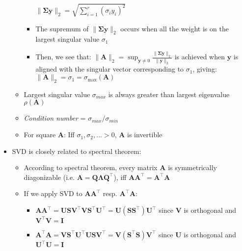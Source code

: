 \begin{itemize}
\begin{itemize}
\begin{itemize}
            $\|\boldsymbol{\Sigma} \boldsymbol{y}\|_2 = \sqrt{\sum_{i=1}^r (\sigma_i y_i)^2}$
            \item The supremum of $\|\boldsymbol{\Sigma} \boldsymbol{y}\|_2$ occurs when all the weight is on the largest singular value $\sigma_1$ 
            \item Then, we see that:
            $\|\boldsymbol{A}\|_2 = \sup_{\boldsymbol{y} \neq 0} \frac{\|\boldsymbol{\Sigma} \boldsymbol{y}\|_2}{\|\boldsymbol{y}\|_2}$ is achieved when $\boldsymbol{y}$ is aligned with the singular vector corresponding to $\sigma_1$, giving:
            $\|\boldsymbol{A}\|_2 = \sigma_1 = \sigma_{\max}(\boldsymbol{A})$
        \end{itemize}
        \item Largest singular value $\sigma_{max}$ is always greater than largest eigenvalue $\rho(\boldsymbol{A})$
        \item \emph{Condition number} = $\sigma_{max} / \sigma_{min}$
        \item For square $\boldsymbol{A}$: Iff $\sigma_1, \sigma_2, ... > 0$, $\boldsymbol{A}$ is invertible 
    \end{itemize}
    \item SVD is closely related to spectral theorem:
    \begin{itemize}
        \item According to spectral theorem, every matrix $\boldsymbol{A}$ is symmetrically diagonizable (i.e. $\boldsymbol{A} = \boldsymbol{Q} \boldsymbol{\Lambda} \boldsymbol{Q}^\intercal$), iff $\boldsymbol{A}\boldsymbol{A}^\intercal = \boldsymbol{A}^\intercal\boldsymbol{A}$
        \item If we apply SVD to $\boldsymbol{A}\boldsymbol{A}^\intercal$ resp. $\boldsymbol{A}^\intercal\boldsymbol{A}$:
        \begin{itemize}
            \item $\boldsymbol{A}\boldsymbol{A}^\intercal = \boldsymbol{U}\boldsymbol{S}\boldsymbol{V}^\intercal\boldsymbol{V}\boldsymbol{S}^\intercal\boldsymbol{U}^\intercal = \boldsymbol{U}(\boldsymbol{S}\boldsymbol{S}^\intercal)\boldsymbol{U}^\intercal$ since $\boldsymbol{V}$ is orthogonal and $\boldsymbol{V}^\intercal \boldsymbol{V} = \boldsymbol{I}$
            \item $\boldsymbol{A}^\intercal\boldsymbol{A} = \boldsymbol{V}\boldsymbol{S}^\intercal\boldsymbol{U}^\intercal\boldsymbol{U}\boldsymbol{S}\boldsymbol{V}^\intercal = \boldsymbol{V}(\boldsymbol{S}^\intercal\boldsymbol{S})\boldsymbol{V}^\intercal$ since $\boldsymbol{U}$ is orthogonal and $\boldsymbol{U}^\intercal \boldsymbol{U} = \boldsymbol{I}$

\end{itemize}
\end{itemize}
\end{itemize}
